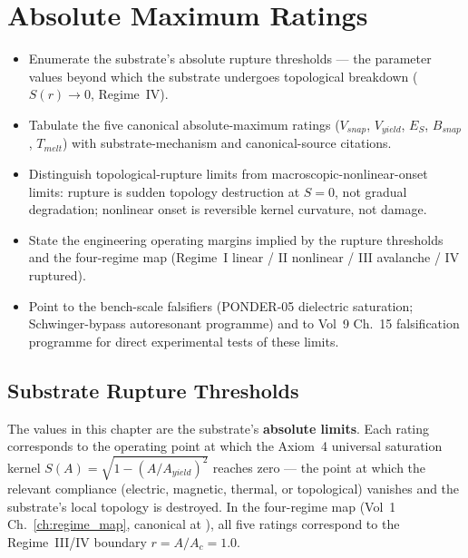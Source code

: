 \chapter{Absolute Maximum Ratings}
\label{ch:vol9_absolute_maximum_ratings}

\begin{objectivebox}
\begin{itemize}
    \item Enumerate the substrate's absolute rupture thresholds --- the parameter values beyond which the substrate undergoes topological breakdown ($S(r) \to 0$, Regime~IV).
    \item Tabulate the five canonical absolute-maximum ratings ($V_{snap}$, $V_{yield}$, $E_S$, $B_{snap}$, $T_{melt}$) with substrate-mechanism and canonical-source citations.
    \item Distinguish topological-rupture limits from macroscopic-nonlinear-onset limits: rupture is sudden topology destruction at $S = 0$, not gradual degradation; nonlinear onset is reversible kernel curvature, not damage.
    \item State the engineering operating margins implied by the rupture thresholds and the four-regime map (Regime~I linear / II nonlinear / III avalanche / IV ruptured).
    \item Point to the bench-scale falsifiers (PONDER-05 dielectric saturation; Schwinger-bypass autoresonant programme) and to Vol~9 Ch.~15 falsification programme for direct experimental tests of these limits.
\end{itemize}
\end{objectivebox}

\section{Substrate Rupture Thresholds}
\label{sec:vol9_absmax_intro}

The values in this chapter are the substrate's \textbf{absolute limits}. Each rating corresponds to the operating point at which the Axiom~4 universal saturation kernel $S(A) = \sqrt{1 - (A/A_{yield})^2}$ reaches zero --- the point at which the relevant compliance (electric, magnetic, thermal, or topological) vanishes and the substrate's local topology is destroyed. In the four-regime map (Vol~1 Ch.~\ref{ch:regime_map}, canonical at ), all five ratings correspond to the Regime~III/IV boundary $r = A/A_c = 1.0$.

